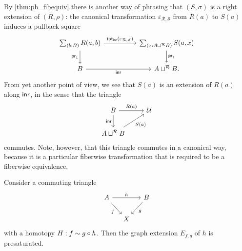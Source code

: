 \begin{rmk}
By \cref{thm:pb_fibequiv} there is another way of phrasing that $(S,\sigma)$ is a right extension of $(R,\rho)$: the canonical transformation $\varepsilon_{\mathcal{R},\mathcal{S}}$ from $R(a)$ to $S(a)$ induces a pullback square
\begin{equation*}
\begin{tikzcd}[column sep=huge]
\sm{b:B}R(a,b) \arrow[d,swap,"\proj 1"] \arrow[r,"{\total[\inr]{\varepsilon_{\mathcal{R},\mathcal{S}}}}"] & \sm{x:A\sqcup^{\mathcal{R}} B}S(a,x) \arrow[d,"\proj 1"] \\
B \arrow[r,swap,"\inr"] & A\sqcup^{\mathcal{R}} B.
\end{tikzcd}
\end{equation*}
From yet another point of view, we see that $S(a)$ is an extension of $R(a)$ along ${\mathsf{inr}}$, in the sense that the triangle
\begin{equation*}
\begin{tikzcd}
B \arrow[d,swap,"\inr"] \arrow[r,"R(a)"] & \UU \\
A\sqcup^{\mathcal{R}}B \arrow[ur,swap,"S(a)"]
\end{tikzcd}
\end{equation*}
commutes. Note, however, that this triangle commutes in a canonical way, because it is a particular fiberwise transformation that is required to be a fiberwise equivalence.
\end{rmk}

\begin{lem}\label{thm:pb_presat}
Consider a commuting triangle
\begin{equation*}
\begin{tikzcd}[column sep=small]
A \arrow[rr,"h"] \arrow[dr,swap,"f"] & & B \arrow[dl,"g"] \\
& X
\end{tikzcd}
\end{equation*}
with a homotopy $H:f\sim g\circ h$. Then the graph extension $E_{f,g}$ of $h$ is presaturated.
\end{lem}

